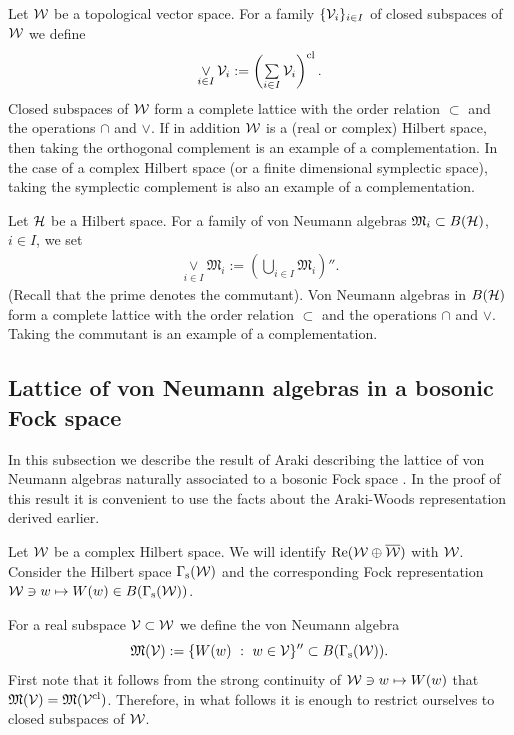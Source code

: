 \documentclass{svmult}
\def\Re{{\rm Re}}
\def\cl{{\rm cl}}
\def\bar{\overline}
\def\s{{\rm s}}
\def\cV{{\cal V}}
\def\cW{{\cal W}}
\def\fM{{\mathfrak M}}
\def\cH{{\cal H}}
\def\cH{{\cal H}}
\def\s{{\rm s}}
\begin{document}
Let $\cW$ be a topological vector space.
For a family $\{\cV_i\}_{i\in I}$ of closed subspaces of $\cW$  we define
\[\begin{array}{l}
\mathop{\vee}\limits_{i\in I}\cV_i:=\left(\sum\limits_{i\in
  I}\cV_i\right)^\cl.\end{array}
\]
Closed subspaces of 
$\cW$ form a complete lattice with the order relation
$\subset$ and the operations $\cap$
and $\vee$.
If in addition $\cW$ is a (real or complex) Hilbert space, then taking the
orthogonal complement is an example of  a complementation. 
In the case of a complex
Hilbert space (or a finite dimensional symplectic space),
 taking the symplectic complement is also
an  example of a complementation.

Let $\cH$ be a Hilbert space.
For a family of von Neumann algebras $\fM_i\subset B(\cH)$, $i\in I$,
 we set
\[\begin{array}{l}
\mathop{\vee}\limits_{i\in I}\fM_i:=\left(\bigcup\limits_{i\in
  I}\fM_i\right)''.\end{array}
\](Recall that the prime denotes the commutant).
Von Neumann algebras in $B(\cH)$ form a complete lattice with the order
relation $\subset$
and the operations
$\cap$ and $\vee$.
Taking the commutant is an example of 
 a complementation.











\subsection{Lattice of von Neumann algebras in a bosonic Fock space}

In this subsection we describe the result of Araki describing the lattice of von
Neumann algebras naturally associated to a bosonic Fock space \cite{Ar4,EO}.
 In the proof of
this result it is convenient to use the facts about the Araki-Woods
representation derived earlier.


Let $\cW$ be a complex Hilbert space.
 We will identify $\Re(\cW\oplus\bar\cW)$ with $\cW$.
Consider the Hilbert space $\Gamma_\s(\cW)$ and the corresponding Fock
representation $\cW\ni w\mapsto W(w)\in
B(\Gamma_\s(\cW))$.

For a  real
 subspace $\cV\subset\cW$ we define the von Neumann algebra
\[\fM(\cV):=\{W(w)\ :\ w\in\cV\}''\subset B(\Gamma_\s(\cW)).\]
First note that it follows from the strong continuity of $\cW
\ni w\mapsto W(w)$ that $\fM(\cV)=\fM(\cV^\cl)$. Therefore, in what follows it
is enough to restrict ourselves to closed subspaces of $\cW$.
\end{document}
